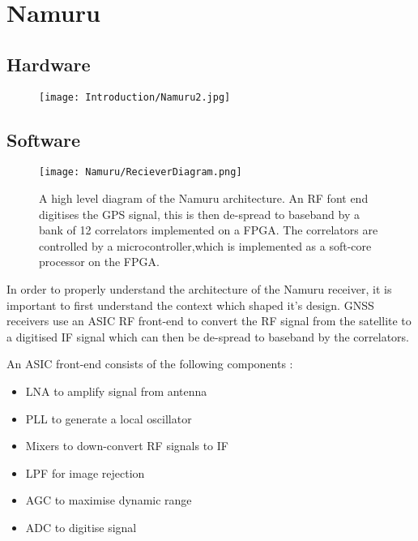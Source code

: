 \section{Namuru}

\subsection{Hardware}

\begin{figure}[!htb] 
    \centering
    \texttt{[image: Introduction/Namuru2.jpg]} 
    \caption{}
    \label{fig:Namuru2}
\end{figure}


\subsection{Software}

\begin{figure}[!htb] 
    \centering
    \texttt{[image: Namuru/RecieverDiagram.png]} 
    \caption{A high level diagram of the Namuru architecture. An RF font end digitises the GPS signal, this is then de-spread to baseband by a bank of 12 correlators implemented on a FPGA. The correlators are controlled by a microcontroller,which is implemented as a soft-core processor on the FPGA.}
    \label{fig:RecieverDiagram}
\end{figure}

In order to properly understand the architecture of the Namuru receiver, it is important to first understand the context which shaped it's design. \ac{GNSS} receivers use an \ac{ASIC} RF front-end to convert the \ac{RF} signal from the satellite to a digitised \ac{IF} signal which can then be de-spread to baseband by the correlators. 

An \ac{ASIC} front-end consists of the following components \cite{GlennonPresentation}: 

\begin{itemize}
\item{\ac{LNA} to amplify signal from antenna}
\item{\ac{PLL} to generate a local oscillator}
\item{Mixers to down-convert RF signals to IF}
\item{\ac{LPF} for image rejection}
\item{\ac{AGC} to maximise dynamic range}
\item{\ac{ADC} to digitise signal}
\end{itemize}


